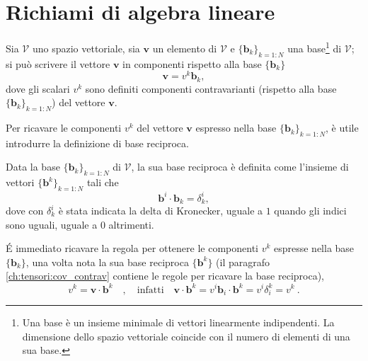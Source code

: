 \vspace{30pt}
\section{Richiami di algebra lineare}
\vspace{10pt}

\begin{definition}
Sia $\mathcal{V}$ uno spazio vettoriale, sia $\bm{v}$ un elemento di $\mathcal{V}$
 e $\{ \bm{b}_k \}_{k=1:N}$ una base\footnote{Una base è un insieme minimale di vettori linearmente indipendenti. La dimensione dello spazio vettoriale coincide con il numero di elementi di una sua base.} di $\mathcal{V}$; si può scrivere il vettore $\bm{v}$ in componenti rispetto alla base $\{ \bm{b}_k \}$
\begin{equation}
  \bm{v} = v^k \bm{b}_k ,
\end{equation}
 dove gli scalari $v^k$ sono definiti componenti contravarianti (rispetto alla base $\{ \bm{b}_k \}_{k=1:N}$) del vettore $\bm{v}$.
\end{definition}
%
Per ricavare le componenti $v^k$ del vettore $\bm{v}$ espresso nella base $\{ \bm{b}_k \}_{k=1:N}$, è utile introdurre la definizione di base reciproca.
\begin{definition}
Data la base $\{ \bm{b}_k \}_{k=1:N}$ di $\mathcal{V}$, la sua
 base reciproca è definita come l'insieme di vettori $\{ \bm{b}^k \}_{k=1:N}$ tali che
\begin{equation}\label{eqn:defBaseReciproca}
  \bm{b}^i \cdot \bm{b}_k = \delta_k^i ,
\end{equation}
 dove con $\delta_k^i$ è stata indicata la delta di Kronecker, uguale a $1$ quando gli indici sono uguali, uguale a $0$ altrimenti.
\end{definition}
\'E immediato ricavare la regola per ottenere le componenti $v^k$ espresse nella base $\{ \bm{b}_k \}$, una volta nota la sua base reciproca $\{ \bm{b}^k \}$ (il paragrafo \ref{ch:tensori:cov_contrav} contiene le regole per ricavare la base reciproca),
\begin{equation}
    v^k = \bm{v} \cdot \bm{b}^k \quad  , \quad \text{infatti} \quad 
    \bm{v} \cdot \bm{b}^k = v^i \bm{b}_i \cdot \bm{b}^k = v^i \delta_i^k = v^k \ .
\end{equation}
